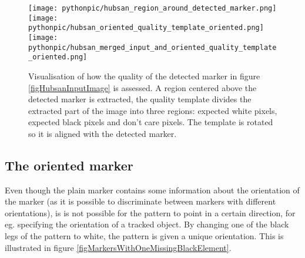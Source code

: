 \documentclass{article}
\begin{document}
\begin{figure}
\texttt{[image: pythonpic/hubsan\_region\_around\_detected\_marker.png]}
\hfill
\texttt{[image: pythonpic/hubsan\_oriented\_quality\_template\_oriented.png]}
\hfill
\texttt{[image: pythonpic/hubsan\_merged\_input\_and\_oriented\_quality\_template\_oriented.png]}
\caption{Visualisation of how the quality of the detected marker in figure \ref{figHubsanInputImage} is assessed.
A region centered above the detected marker is extracted, the quality template divides the extracted part
of the image into three regions: expected white pixels, expected black pixels and don't care pixels.
The template is rotated so it is aligned with the detected marker.}
\label{figQualityEstimationProcess}
\end{figure}

\subsection{The oriented marker}
Even though the plain marker contains some information about the orientation of the
marker (as it is possible to discriminate between markers with different orientations),
is is not possible for the pattern to point in a certain direction, for eg. specifying the orientation of a tracked object.
By changing one of the black legs of the pattern to white, the pattern is given
a unique orientation.
This is illustrated in figure \ref{figMarkersWithOneMissingBlackElement}.
\end{document}
